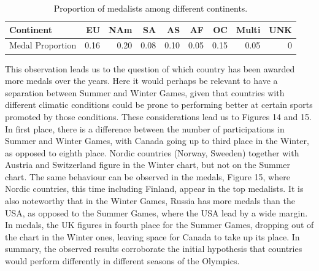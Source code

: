 \documentclass[11pt]{article} %
\begin{document}
\begin{table}
\centering
\begin{tabular}{lrrrrrrrr}
\toprule
Continent  &EU    & NAm   & SA    & AS    & AF    & OC    &  Multi & UNK   \\
\midrule
Medal Proportion  &          0.16 &          0.20 &          0.08 &          0.10 &          0.05 &          0.15 &          0.05 &          0 \\
\bottomrule
\end{tabular}
\caption{Proportion of medalists among different continents.}
\end{table}

This observation leads us to the question of which country has been awarded more medals over the years. Here it would perhaps be relevant to have a separation between Summer and Winter Games, given that countries with different climatic conditions could be prone to performing better at certain sports promoted by those conditions. These considerations lead us to Figures 14 and 15. In first place, there is a difference between the number of participations in Summer and Winter Games, with Canada going up to third place in the Winter, as opposed to eighth place. Nordic countries (Norway, Sweeden) together with Austria and Switzerland figure in the Winter chart, but not on the Summer chart. The same behaviour can be observed in the medals, Figure 15, where Nordic countries, this time including Finland, appear in the top medalists. It is also noteworthy that in the Winter Games, Russia has more medals than the USA, as opposed to the Summer Games, where the USA lead by a wide margin. In medals, the UK figures in fourth place for the Summer Games, dropping out of the chart in the Winter ones, leaving space for Canada to take up its place. In summary, the observed results corroborate the initial hypothesis that countries would perform differently in different seasons of the Olympics.
\end{document}
